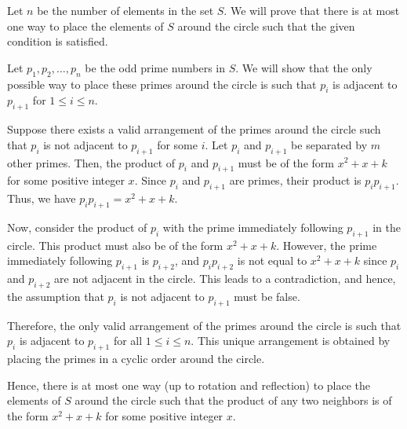 Let $n$ be the number of elements in the set $S$. We will prove that there is at most one way to place the elements of $S$ around the circle such that the given condition is satisfied.

Let $p_1, p_2, \ldots, p_n$ be the odd prime numbers in $S$. We will show that the only possible way to place these primes around the circle is such that $p_i$ is adjacent to $p_{i+1}$ for $1 \leq i \leq n$.

Suppose there exists a valid arrangement of the primes around the circle such that $p_i$ is not adjacent to $p_{i+1}$ for some $i$. Let $p_i$ and $p_{i+1}$ be separated by $m$ other primes. Then, the product of $p_i$ and $p_{i+1}$ must be of the form $x^2 + x + k$ for some positive integer $x$. Since $p_i$ and $p_{i+1}$ are primes, their product is $p_ip_{i+1}$. Thus, we have $p_ip_{i+1} = x^2 + x + k$.

Now, consider the product of $p_i$ with the prime immediately following $p_{i+1}$ in the circle. This product must also be of the form $x^2 + x + k$. However, the prime immediately following $p_{i+1}$ is $p_{i+2}$, and $p_ip_{i+2}$ is not equal to $x^2 + x + k$ since $p_i$ and $p_{i+2}$ are not adjacent in the circle. This leads to a contradiction, and hence, the assumption that $p_i$ is not adjacent to $p_{i+1}$ must be false.

Therefore, the only valid arrangement of the primes around the circle is such that $p_i$ is adjacent to $p_{i+1}$ for all $1 \leq i \leq n$. This unique arrangement is obtained by placing the primes in a cyclic order around the circle.

Hence, there is at most one way (up to rotation and reflection) to place the elements of $S$ around the circle such that the product of any two neighbors is of the form $x^2 + x + k$ for some positive integer $x$.

